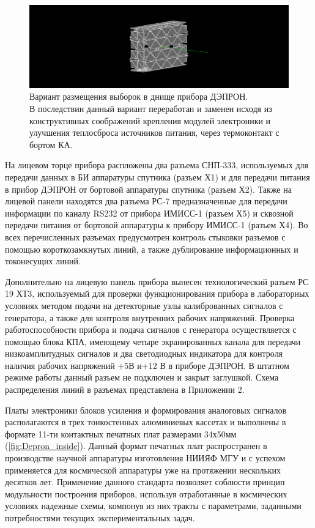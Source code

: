 \begin{figure}
\centering
\includegraphics[width=0.7\linewidth]{images/viborki}
\caption{ Вариант размещения выборок в днище прибора ДЭПРОН.\\ В последствии данный вариант переработан и заменен исходя из конструктивных соображений крепления модулей электроники и улучшения теплосброса источников питания, через термоконтакт с бортом КА. }
\label{fig:viborki}
\end{figure}


На лицевом торце прибора распложены два разъема СНП-333, используемых для передачи данных в БИ аппаратуры спутника (разъем Х1) и для передачи питания в прибор ДЭПРОН от бортовой аппаратуры спутника (разъем Х2). Также на лицевой панели находятся два разъема РС-7 предназначенные для передачи информации по каналу RS232 от прибора ИМИСС-1 (разъем Х5) и сквозной передачи питания от бортовой аппаратуры к прибору ИМИСС-1 (разъем Х4). Во всех перечисленных разъемах предусмотрен контроль стыковки разъемов с помощью короткозамкнутых линий, а также дублирование информационных и токонесущих линий.


Дополнительно на лицевую панель прибора вынесен технологический разъем РС 19 ХТ3, используемый для проверки функционирования прибора в лабораторных условиях методом подачи на детекторные узлы калиброванных сигналов с генератора, а также для контроля внутренних рабочих напряжений. Проверка работоспособности прибора и подача сигналов с генератора осуществляется с помощью  блока КПА, имеющему четыре экранированных канала для передачи низкоамплитудных сигналов и два светодиодных индикатора для контроля наличия рабочих напряжений  $ +5  $В и$  +12 $ В в приборе ДЭПРОН.  В штатном режиме работы данный разъем не подключен и закрыт заглушкой. Схема распределения линий в разъемах представлена в Приложении 2.

Платы электроники блоков усиления и формирования аналоговых сигналов располагаются в трех тонкостенных алюминиевых кассетах и выполнены в формате 11-ти контактных печатных плат размерами 34х50мм (\ref{fig:Depron_inside}). Данный формат печатных плат распространен в производстве научной аппаратуры изготовления НИИЯФ МГУ и с успехом применяется для космической аппаратуры уже на протяжении нескольких десятков лет. Применение данного стандарта позволяет соблюсти принцип модульности построения приборов, используя отработанные в космических условиях надежные схемы, компонуя из них тракты с параметрами, заданными потребностями текущих экспериментальных задач. 

